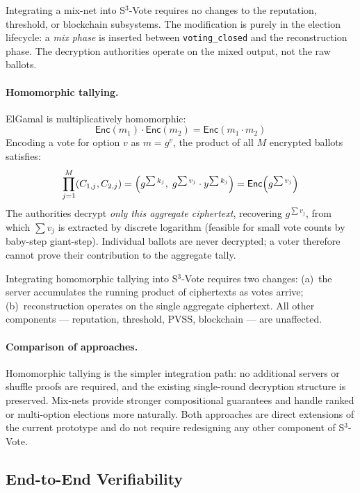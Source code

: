 \documentclass[12pt,a4paper]{article}
\theoremstyle{definition}
\theoremstyle{remark}
\begin{document}
Integrating a mix-net into S$^3$-Vote requires no changes to the reputation,
threshold, or blockchain subsystems.
The modification is purely in the election lifecycle: a \emph{mix phase}
is inserted between \texttt{voting\_closed} and the reconstruction phase.
The decryption authorities operate on the mixed output, not the raw ballots.

\paragraph{Homomorphic tallying.}
ElGamal is multiplicatively homomorphic:
\begin{equation}
  \mathsf{Enc}(m_1) \cdot \mathsf{Enc}(m_2) = \mathsf{Enc}(m_1 \cdot m_2)
\end{equation}
Encoding a vote for option $v$ as $m = g^v$, the product of all $M$
encrypted ballots satisfies:
\begin{equation}
  \prod_{j=1}^{M} (C_{1,j}, C_{2,j})
  = \Bigl(g^{\sum k_j},\; g^{\sum v_j} \cdot y^{\sum k_j}\Bigr)
  = \mathsf{Enc}\!\left(g^{\sum v_j}\right)
\end{equation}
The authorities decrypt \emph{only this aggregate ciphertext}, recovering
$g^{\sum v_j}$, from which $\sum v_j$ is extracted by discrete logarithm
(feasible for small vote counts by baby-step giant-step).
Individual ballots are never decrypted; a voter therefore cannot prove
their contribution to the aggregate tally.

Integrating homomorphic tallying into S$^3$-Vote requires two changes:
(a)~the server accumulates the running product of ciphertexts as votes
arrive; (b)~reconstruction operates on the single aggregate ciphertext.
All other components — reputation, threshold, PVSS, blockchain — are
unaffected.

\paragraph{Comparison of approaches.}
Homomorphic tallying is the simpler integration path: no additional servers
or shuffle proofs are required, and the existing single-round decryption
structure is preserved.
Mix-nets provide stronger compositional guarantees and handle ranked or
multi-option elections more naturally.
Both approaches are direct extensions of the current prototype and do not
require redesigning any other component of S$^3$-Vote.

\subsection{End-to-End Verifiability}
\label{sec:e2ev}
\end{document}
